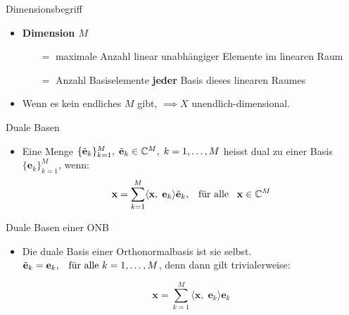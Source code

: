 \documentclass[14pt, aspectratio=169, handout]{beamer}
\begin{document}
\begin{frame}{Dimensionsbegriff}
    \begin{itemize}
        \item \textbf{Dimension $M$} \begin{itemize}
            \item[$=$] maximale Anzahl linear unabhängiger Elemente im linearen Raum
            \item[] 
            \item[$=$] Anzahl Basiselemente \textbf{jeder} Basis dieses linearen Raumes
        \end{itemize}
        \item[]
        \item Wenn es kein endliches $M$ gibt, $\implies X$ unendlich-dimensional.
    \end{itemize}
\end{frame}

\begin{frame}{Duale Basen}
    \begin{itemize}
        \item Eine Menge $\{\Tilde{\mathbf{e}}_k\}_{k=1}^M, \; \Tilde{\mathbf{e}}_k \in \mathbb{C}^M, \; k = 1,\dots, M$ heisst dual zu einer Basis $\{\mathbf{e}_k\}_{k=1}^M$, wenn:
    $$\mathbf{x} = \sum_{k=1}^M \langle \mathbf{x}, \; \mathbf{e}_k \rangle \Tilde{\mathbf{e}}_k, \hspace{5pt} \text{ für alle } \hspace{5pt} \mathbf{x} \in \mathbb{C}^M$$
    \end{itemize}
\end{frame}

\begin{frame}{Duale Basen einer ONB}
    \begin{itemize}
        \item Die duale Basis einer Orthonormalbasis ist sie selbst. $\Tilde{\mathbf{e}}_k = \mathbf{e}_k, \hspace{5pt} \text{ für alle } k=1, \dots, M$, denn dann gilt trivialerweise:
        \item[] $$\mathbf{x} = \sum_{k=1}^M \langle \mathbf{x}, \; \mathbf{e}_k \rangle \mathbf{e}_k$$
        \item[] 
        \item[] 
        \item[] 
        \item[] 
        \item[] 
        \item[] 
    \end{itemize}
\end{frame}
\end{document}
